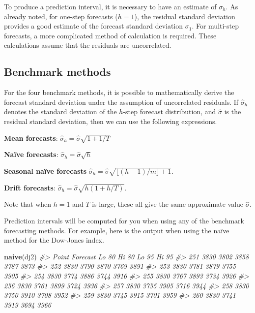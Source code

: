 \documentclass[]{book}
\newenvironment{Shaded}{\begin{snugshade}}{\end{snugshade}}
\newcommand{\CommentTok}[1]{\textcolor[rgb]{0.56,0.35,0.01}{\textit{#1}}}
\newcommand{\KeywordTok}[1]{\textcolor[rgb]{0.13,0.29,0.53}{\textbf{#1}}}
\newcommand{\NormalTok}[1]{#1}
\begin{document}
To produce a prediction interval, it is necessary to have an estimate of \(\sigma_h\). As already noted, for one-step forecasts (\(h=1\)), the residual standard deviation provides a good estimate of the forecast standard deviation \(\sigma_1\). For multi-step forecasts, a more complicated method of calculation is required. These calculations assume that the residuals are uncorrelated.

\hypertarget{benchmark-methods}{%
\subsection*{Benchmark methods}\label{benchmark-methods}}

For the four benchmark methods, it is possible to mathematically derive the forecast standard deviation under the assumption of uncorrelated residuals. If \(\hat{\sigma}_h\) denotes the standard deviation of the \(h\)-step forecast distribution, and \(\hat{\sigma}\) is the residual standard deviation, then we can use the following expressions.

\textbf{Mean forecasts}: \(\hat\sigma_h = \hat\sigma\sqrt{1 + 1/T}\)

\textbf{Naïve forecasts}: \(\hat\sigma_h = \hat\sigma\sqrt{h}\)

\textbf{Seasonal naïve forecasts} \(\hat\sigma_h = \hat\sigma\sqrt{\lfloor (h-1)/m \rfloor + 1}\).

\textbf{Drift forecasts}: \(\hat\sigma_h = \hat\sigma\sqrt{h(1+h/T)}\).

Note that when \(h=1\) and \(T\) is large, these all give the same approximate value \(\hat\sigma\).

Prediction intervals will be computed for you when using any of the benchmark forecasting methods. For example, here is the output when using the naïve method for the Dow-Jones index.

\begin{Shaded}
\begin{Highlighting}[]
\KeywordTok{naive}\NormalTok{(dj2)}
\CommentTok{#>     Point Forecast Lo 80 Hi 80 Lo 95 Hi 95}
\CommentTok{#> 251           3830  3802  3858  3787  3873}
\CommentTok{#> 252           3830  3790  3870  3769  3891}
\CommentTok{#> 253           3830  3781  3879  3755  3905}
\CommentTok{#> 254           3830  3774  3886  3744  3916}
\CommentTok{#> 255           3830  3767  3893  3734  3926}
\CommentTok{#> 256           3830  3761  3899  3724  3936}
\CommentTok{#> 257           3830  3755  3905  3716  3944}
\CommentTok{#> 258           3830  3750  3910  3708  3952}
\CommentTok{#> 259           3830  3745  3915  3701  3959}
\CommentTok{#> 260           3830  3741  3919  3694  3966}
\end{Highlighting}
\end{Shaded}
\end{document}
